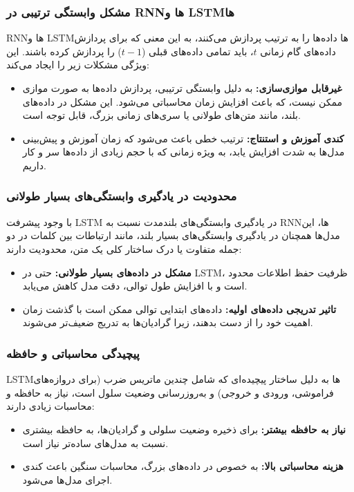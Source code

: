 \subsubsection{ مشکل وابستگی ترتیبی در RNNها و LSTMها}

RNNها و LSTMها داده‌ها را به ترتیب پردازش می‌کنند، به این معنی که برای پردازش داده‌های گام زمانی \( t \)، باید تمامی داده‌های قبلی (\( t-1 \)) را پردازش کرده باشند. این ویژگی مشکلات زیر را ایجاد می‌کند:

\begin{itemize}
	\item \textbf{غیرقابل موازی‌سازی:} به دلیل وابستگی ترتیبی، پردازش داده‌ها به صورت موازی ممکن نیست، که باعث افزایش زمان محاسباتی می‌شود. این مشکل در داده‌های بلند، مانند متن‌های طولانی یا سری‌های زمانی بزرگ، قابل توجه است.
	\item \textbf{کندی آموزش و استنتاج:} ترتیب خطی باعث می‌شود که زمان آموزش و پیش‌بینی مدل‌ها به شدت افزایش یابد، به ویژه زمانی که با حجم زیادی از داده‌ها سر و کار داریم.
\end{itemize}


\subsubsection{ محدودیت در یادگیری وابستگی‌های بسیار طولانی}
با وجود پیشرفت LSTM در یادگیری وابستگی‌های بلندمدت نسبت به RNNها، این مدل‌ها همچنان در یادگیری وابستگی‌های بسیار بلند، مانند ارتباطات بین کلمات در دو جمله متفاوت یا درک ساختار کلی یک متن، محدودیت دارند:


\begin{itemize}
	\item \textbf{مشکل در داده‌های بسیار طولانی:} حتی در LSTM، ظرفیت حفظ اطلاعات محدود است و با افزایش طول توالی، دقت مدل کاهش می‌یابد.
	\item \textbf{تاثیر تدریجی داده‌های اولیه:} داده‌های ابتدایی توالی ممکن است با گذشت زمان اهمیت خود را از دست بدهند، زیرا گرادیان‌ها به تدریج ضعیف‌تر می‌شوند.
\end{itemize}


\subsubsection{پیچیدگی محاسباتی و حافظه}

LSTMها به دلیل ساختار پیچیده‌ای که شامل چندین ماتریس ضرب (برای دروازه‌های فراموشی، ورودی و خروجی) و به‌روزرسانی وضعیت سلول است، نیاز به حافظه و محاسبات زیادی دارند:


\begin{itemize}
	\item \textbf{نیاز به حافظه بیشتر:} برای ذخیره وضعیت سلولی و گرادیان‌ها، به حافظه بیشتری نسبت به مدل‌های ساده‌تر نیاز است.
	\item \textbf{هزینه محاسباتی بالا:} به خصوص در داده‌های بزرگ، محاسبات سنگین باعث کندی اجرای مدل‌ها می‌شود.
\end{itemize}


